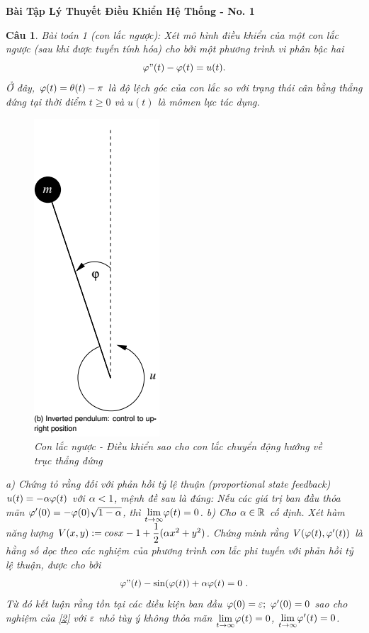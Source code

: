 \documentclass[11pt]{article}
\newtheorem{bt}{Câu}
\begin{document}



\begin{center}
	{\bf Bài Tập Lý Thuyết Điều Khiển Hệ Thống - No. 1}
\end{center}

\begin{bt}
Bài toán 1 (con lắc ngược): Xét mô hình điều khiển của một con lắc ngược (sau khi được tuyến tính hóa) cho bởi một phương trình vi phân bậc hai
\begin{equation}\label{1}
\varphi"(t) - \varphi(t) = u(t).
\end{equation}
%
Ở đây, $\varphi(t) = \theta(t) - \pi$ là độ lệch góc của con lắc so với trạng thái cân bằng thẳng đứng tại thời điểm $t \geq 0$ và $u(t)$ là mômen lực tác dụng. \\ 
%
\begin{figure}[!h]
	\centering
	\includegraphics[scale = 0.7]{Figures/inverted_pendulum}
	\caption{Con lắc ngược - Điều khiển sao cho con lắc chuyển động hướng về trục thẳng đứng}
	\label{fig:invertedpendulum}
\end{figure}

\noindent  a) Chứng tỏ rằng đối với phản hồi tỷ lệ thuận (proportional state feedback) $u(t) = -\alpha \varphi(t)$ với $\alpha <1$, mệnh đề sau là đúng: 
Nếu các giá trị ban đầu thỏa mãn $\varphi'(0) = - {\varphi}(0)\sqrt{1-\alpha}$, thì $\underset{t\rightarrow \infty}{\lim} \varphi(t) = 0$.
b) Cho $\alpha \in \mathbb{R}$ cố định. Xét hàm năng lượng $V(x,y):= cos x - 1 + \dfrac{1}{2} (\alpha x^2 +y^2)$. Chứng minh rằng $V(\varphi(t),\varphi'(t))$ là hằng số dọc theo các nghiệm của phương trình con lắc phi tuyến với phản hồi tỷ lệ thuận, được cho bởi
\begin{equation}\label{2}
	\varphi"(t) - \sin(\varphi(t)) + \alpha \varphi(t) = 0 \ .
\end{equation}
%
Từ đó kết luận rằng tồn tại các điều kiện ban đầu $\varphi(0)= \varepsilon; \ \varphi'(0) = 0$ sao cho nghiệm của \eqref{2} với $\varepsilon$ nhỏ tùy ý không thỏa mãn $\underset{t\rightarrow \infty}{\lim} \varphi(t) = 0$, $\underset{t\rightarrow \infty}{\lim} \varphi'(t) = 0$. \\
\end{bt}
\end{document}
